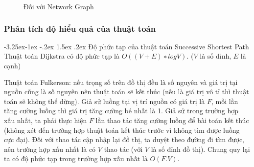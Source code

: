 \documentclass[a4paper]{article}
\makeatletter
\newcounter {subsubsubsection}[subsubsection]
\newcommand\subsubsubsection{\@startsection{subsubsubsection}{4}{\z@}%
                                     {-3.25ex\@plus -1ex \@minus -.2ex}%
                                     {1.5ex \@plus .2ex}%
                                     {\normalfont\normalsize\bfseries}}
\makeatother
\begin{document}
\begin{figure}[h]
  \centering
  \hfill
  \caption{Đối với Network Graph}
\end{figure}
\newpage
\subsubsection{Phân tích độ hiểu quả của thuật toán}
\subsubsubsection{Độ phức tạp của thuật toán Successive Shortest Path}
{Thuật toán Dijkstra có độ phức tạp là $O((V+E)∗logV)$. ($V$ là số đỉnh, $E$ là cạnh)}

{Thuật toán Fulkerson: nếu trọng số trên đồ thị đều là số nguyên và giá trị tại nguồn cũng là số nguyên nên thuật toán sẽ kết thúc (nếu là giá trị vô tỉ thì thuật toán sẽ không thể dừng). Giả sử luồng tại vị trí nguồn có giá trị là $F$, mỗi lần tăng cường luồng thì giá trị tăng cường bé nhất là 1. Giả sử trong trường hợp xấu nhất, ta phải thực hiện $F$ lần thao tác tăng cường luồng để bài toán kết thúc (không xét đến trường hợp thuật toán kết thúc trước vì không tìm được luồng cực đại). Đối với thao tác cập nhập lại đồ thị, ta duyệt theo đường đi tìm được, nên trường hợp xấu nhất là có $V$ thao tác (với $V$ là số đỉnh đồ thị). Chung quy lại ta có độ phức tạp trong trường hợp xấu nhất là $
O(F.V)$.}
\end{document}
